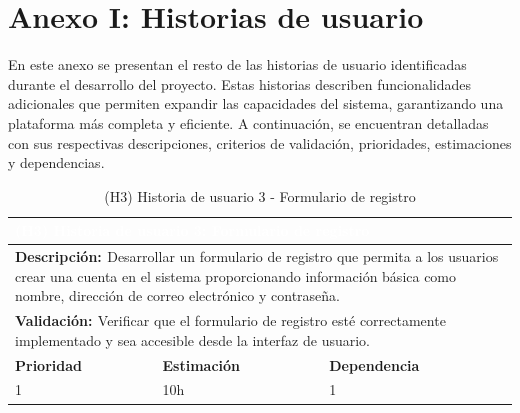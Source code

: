 \appendix
\chapter{Anexo I: Historias de usuario}\label{cap:anexo1}

En este anexo se presentan el resto de las historias de usuario identificadas durante el desarrollo del proyecto. Estas historias describen funcionalidades adicionales que permiten expandir las capacidades del sistema, garantizando una plataforma más completa y eficiente. A continuación, se encuentran detalladas con sus respectivas descripciones, criterios de validación, prioridades, estimaciones y dependencias.

\vspace{0.5cm}

\begin{table}[H]
  \centering
  \renewcommand{\arraystretch}{1.5}
  \begin{tabular}{|p{}|p{}|p{}|}
    \hline
    \multicolumn{3}{|l|}{\cellcolor{OrangeVIU}\textcolor{white}{\textbf{(H3) Historia de usuario 3: Formulario de registro}}} \\
    \hline
    \multicolumn{3}{|p{\dimexpr0.9\linewidth+2\tabcolsep+2\arrayrulewidth}|}{{\textbf{\textcolor{naranja}{Descripción: }}}Desarrollar un formulario de registro que permita a los usuarios crear una cuenta en el sistema proporcionando información básica como nombre, dirección de correo electrónico y contraseña.} \\
    \hline
    \multicolumn{3}{|p{\dimexpr0.9\linewidth+2\tabcolsep+2\arrayrulewidth}|}{{\textbf{\textcolor{naranja}{Validación: }} Verificar que el formulario de registro esté correctamente implementado y sea accesible desde la interfaz de usuario.}} \\
    \hline
    {\textbf{\textcolor{naranja}{Prioridad }}}  & {\textbf{\textcolor{naranja}{Estimación }}}  & {\textbf{\textcolor{naranja}{Dependencia }}}  \\
    \hline
    1 &  10h &  1 \\
    \hline
  \end{tabular}
  \caption{(H3) Historia de usuario 3 - Formulario de registro}
  \label{table:H3}
\end{table}


